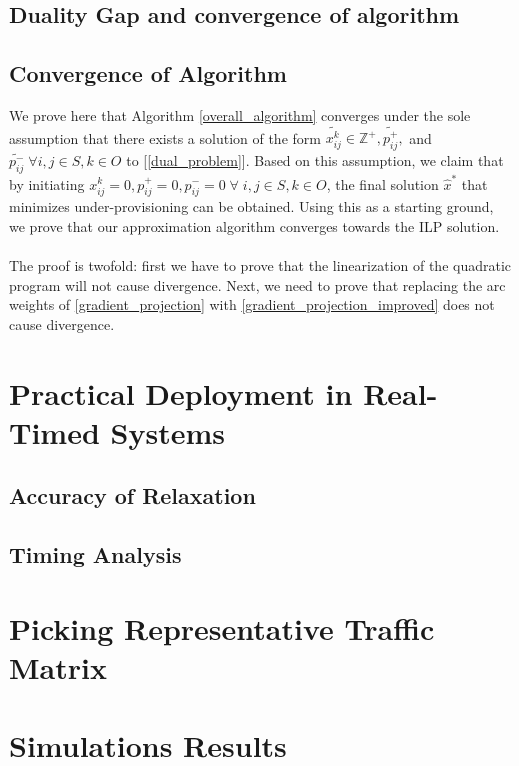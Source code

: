 \documentclass[sigconf]{acmart}
\begin{document}
\subsection{Duality Gap and convergence of algorithm}

\subsection{Convergence of Algorithm}
We prove here that Algorithm \ref{overall_algorithm} converges under the sole assumption that there exists a solution of the form $\tilde{x_{ij}^k} \in \mathbb{Z}^+, \tilde{p_{ij}^+}, $ and $\tilde{p_{ij}^-} \; \forall i,j \in S, k \in O$ to [\ref{dual_problem}]. Based on this assumption, we claim that by initiating $x_{ij}^k = 0, p_{ij}^+ = 0, p_{ij}^- = 0\; \forall \; i, j \in S, k \in O$, the final solution $\hat{x}^*$ that minimizes under-provisioning can be obtained. Using this as a starting ground, we prove that our approximation algorithm converges towards the ILP solution.\\\\
The proof is twofold: first we have to prove that the linearization of the quadratic program will not cause divergence. Next, we need to prove that replacing the arc weights of \ref{gradient_projection} with \ref{gradient_projection_improved} does not cause divergence.

\section{Practical Deployment in Real-Timed Systems}
\subsection{Accuracy of Relaxation} %
\subsection{Timing Analysis} %

\section{Picking Representative Traffic Matrix}
\section{Simulations Results}
\end{document}
